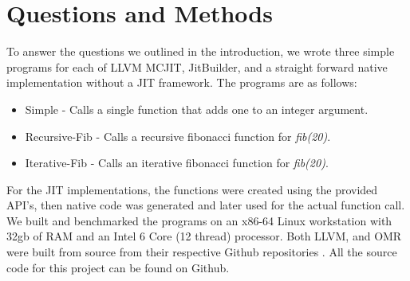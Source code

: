 \section{Questions and Methods}
\label{sec:methodology}
To answer the questions we outlined in the introduction, we wrote three simple programs for each of LLVM MCJIT, JitBuilder, and a straight forward native implementation without a JIT framework.
The programs are as follows:
\begin{itemize}
    \item Simple - Calls a single function that adds one to an integer argument.
    \item Recursive-Fib - Calls a recursive fibonacci function for \textit{fib(20)}.
    \item Iterative-Fib - Calls an iterative fibonacci function for \textit{fib(20)}.  
\end{itemize}
For the JIT implementations, the functions were created using the provided API's, then native code was generated and later used for the actual function call.
We built and benchmarked the programs on an x86-64 Linux workstation with 32gb of RAM and an Intel 6 Core (12 thread) processor. 
Both LLVM, and OMR were built from source from their respective Github repositories \cite{llvmCommit, omrCommit}.
All the source code for this project can be found on Github\cite{projectGithub}.

